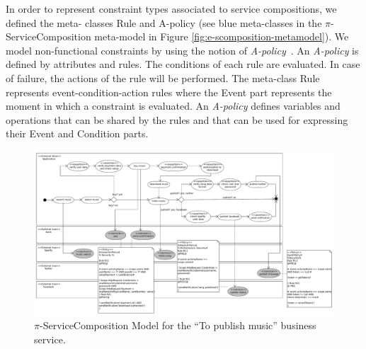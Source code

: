 \documentclass{singlecol-new}
\theoremstyle{TH}{
\newtheorem{lemma}{Lemma}
\newtheorem{theorem}[lemma]{Theorem}
\newtheorem{corrolary}[lemma]{Corrolary}
\newtheorem{conjecture}[lemma]{Conjecture}
\newtheorem{proposition}[lemma]{Proposition}
\newtheorem{claim}[lemma]{Claim}
\newtheorem{stheorem}[lemma]{Wrong Theorem}
\newtheorem{algorithm}{Algorithm}
}
\theoremstyle{THrm}{
\newtheorem{definition}{Definition}[section]
\newtheorem{question}{Question}[section]
\newtheorem{remark}{Remark}
\newtheorem{scheme}{Scheme}
}
\theoremstyle{THhit}{
\newtheorem{case}{Case}[section]
}
\theoremstyle{THhsl}{
\newtheorem{example}{Example}
}
\begin{document}
\begin{compactitem}
\item In order to represent constraint types associated to {service compositions}, we defined the me\-ta- classes {\sc Rule} and {\sc A-policy} (see blue
 meta-classes in the $\pi$-Serv\-ice\-Com\-po\-si\-tion meta-model in Figure \ref{fig:e-scomposition-metamodel}).
We model non-func\-tion\-al constraints by using the notion of {\em A-policy}~\cite{Espinosa-Oviedo2011a,CIC:eovszmc09c}.
An {\em A-policy} is defined by attributes and rules.
The conditions of each rule are evaluated.
In case of failure, the actions of the rule will be performed.
The meta-class {\sc Rule} represents event-condition-action rules where the {\sc Event} part represents the moment in which a constraint  is evaluated.
An {\em A-policy} defines variables and operations that can be shared by the rules and that can be used for expressing their Event and Condition parts.

\end{compactitem}

\begin{figure}[h]
\centering
\includegraphics[width=1\textwidth]{./figures/piServiceComposition-toPublishMusic}
\caption{$\pi$-ServiceComposition Model for the ``To publish music'' business service.}
\label{fig:servicecompositionmodel}
\end{figure}
\end{document}
